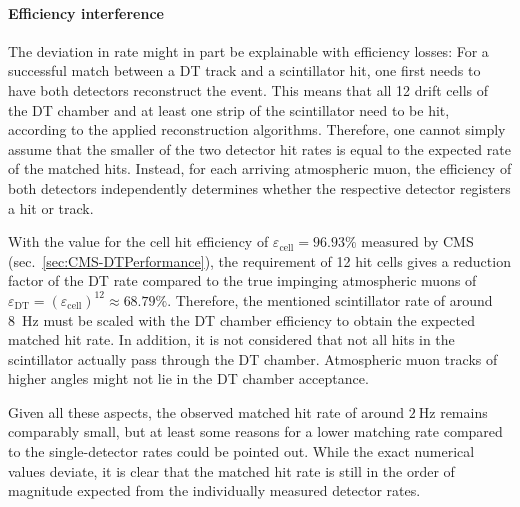 \paragraph{Efficiency interference}
The deviation in rate might in part be explainable with efficiency losses: For a successful match between a \ac{DT} track and a scintillator hit, one first needs to have both detectors reconstruct the event. This means that all 12 drift cells of the \ac{DT} chamber and at least one strip of the scintillator need to be hit, according to the applied reconstruction algorithms. Therefore, one cannot simply assume that the smaller of the two detector hit rates is equal to the expected rate of the matched hits. Instead, for each arriving atmospheric muon, the efficiency of both detectors independently determines whether the respective detector registers a hit or track.
\par With the value for the cell hit efficiency of $\varepsilon_\text{cell}=96.93\%$ measured by \ac{CMS} (sec.\ \ref{sec:CMS-DTPerformance}), the requirement of 12 hit cells gives a reduction factor of the \ac{DT} rate compared to the true impinging atmospheric muons of $\varepsilon_\text{DT}=(\varepsilon_\text{cell})^{12}\approx 68.79\%$. Therefore, the mentioned scintillator rate of around \SI{8}{\hertz} must be scaled with the \ac{DT} chamber efficiency to obtain the expected matched hit rate. In addition, it is not considered that not all hits in the scintillator actually pass through the \ac{DT} chamber. Atmospheric muon tracks of higher angles might not lie in the \ac{DT} chamber acceptance.
\par Given all these aspects, the observed matched hit rate of around $\SI{2}{\hertz}$ remains comparably small, but at least some reasons for a lower matching rate compared to the single-detector rates could be pointed out. While the exact numerical values deviate, it is clear that the matched hit rate is still in the order of magnitude expected from the individually measured detector rates.


